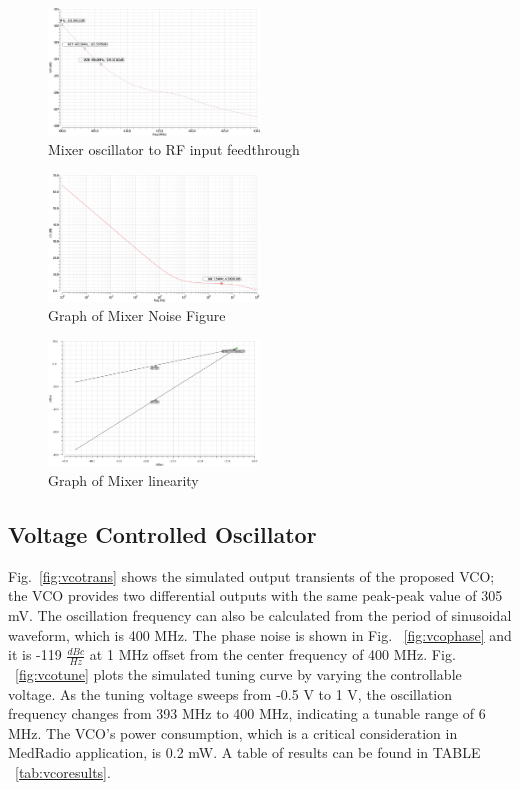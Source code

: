\begin{figure}[H]
   \centering
    \includegraphics[width=0.5\textwidth]{figures/MixerLO-RFfeed.png}
    \caption{Mixer oscillator to RF input feedthrough}
    \label{fig:lorf}
\end{figure}

\begin{figure}[H]
   \centering
    \includegraphics[width=0.5\textwidth]{figures/MixerNoiseFigure.png}
    \caption{Graph of Mixer Noise Figure}
    \label{fig:mixernoise}
\end{figure}

\begin{figure}[H]
   \centering
    \includegraphics[width=0.5\textwidth]{figures/mixerIIP3.png}
    \caption{Graph of Mixer linearity}
    \label{fig:mixerlin}
\end{figure}

\subsection{Voltage Controlled Oscillator}
Fig.~\ref{fig:vcotrans} shows the simulated output transients of the proposed VCO; the VCO provides two differential outputs with the same peak-peak value of 305 mV. The oscillation frequency can also be calculated from the period of sinusoidal waveform, which is 400 MHz. The phase noise is shown in Fig. ~\ref{fig:vcophase} and it is -119 $\frac{dBc}{Hz}$ at 1 MHz offset from the center frequency of 400 MHz. Fig. ~\ref{fig:vcotune} plots the simulated tuning curve by varying the controllable voltage. As the tuning voltage sweeps from -0.5 V to 1 V, the oscillation frequency changes from 393 MHz to 400 MHz, indicating a tunable range of 6 MHz. The VCO’s power consumption, which is a critical consideration in MedRadio application, is 0.2 mW. A table of results can be found in TABLE ~\ref{tab:vcoresults}.


